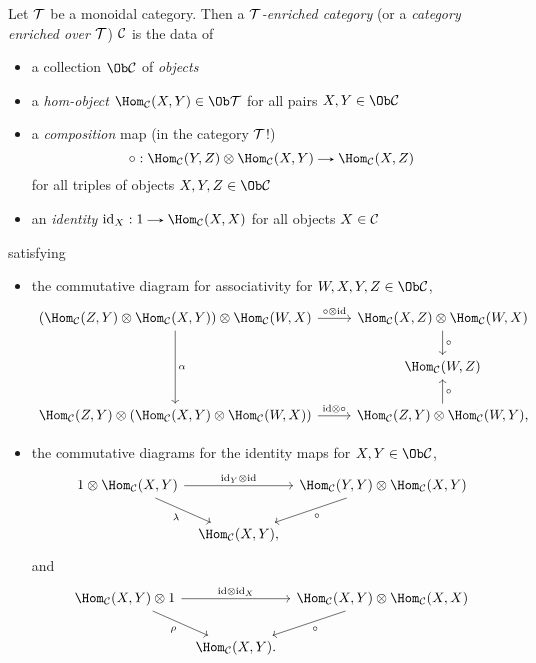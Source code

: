 \begin{definition}
  Let $\mathcal{T}$ be a monoidal category. Then a \textit{$\mathcal{T}$-enriched
    category} (or a \textit{category enriched over $\mathcal{T}$}) $\mathcal{C}$ is the
  data of
  \begin{itemize}
  \item a collection $\Ob\C$ of \textit{objects}
  \item a \textit{hom-object} $\Hom_\C(X,Y) \in \Ob\T$ for all pairs
    $X,Y \in \Ob\C$
  \item a \textit{composition} map (in the category $\mathcal{T}$!)
    \[
    \circ : \Hom_\C(Y,Z) \otimes \Hom_\C(X,Y) \to \Hom_\C(X,Z)
    \]
    for all triples of objects $X,Y,Z \in \Ob\C$
  \item an \textit{identity} $\id_X : 1 \to \Hom_\C(X,X)$ for all
    objects $X \in \mathcal{C}$
  \end{itemize}
  satisfying
  \begin{itemize}
  \item the commutative diagram for associativity for $W,X,Y,Z \in \Ob
    \C$,
    \[
    \begin{tikzcd}
      (\Hom_\C(Z,Y) \otimes \Hom_\C(X,Y)) \otimes \Hom_\C(W,X)
      \rar{\circ \otimes \id} \ar{dd}{\alpha} & \Hom_\C(X,Z) \otimes
      \Hom_\C(W,X) \dar{\circ} \\ \ & \Hom_\C(W,Z) \\ \Hom_\C(Z,Y)
      \otimes (\Hom_\C(X,Y) \otimes \Hom_\C(W,X)) \rar{\id \otimes
        \circ} & \Hom_\C(Z,Y) \otimes \Hom_\C(W,Y),
      \ar{u}[right]{\circ}
    \end{tikzcd}
    \]
  \item the commutative diagrams for the identity maps for $X,Y \in
    \Ob\C$,
    \[
    \begin{tikzcd}[column sep = tiny]
      1 \otimes \Hom_\C(X,Y) \ar{rr}{\id_Y \otimes \id}
      \ar{dr}[below]{\lambda\hspace{10pt}} & \ & \Hom_\C(Y,Y) \otimes
      \Hom_\C(X,Y) \ar{dl}{\circ} \\ \ & \Hom_\C(X,Y), & \
    \end{tikzcd}
    \]
    and
    \[
    \begin{tikzcd}[column sep = tiny]
      \Hom_\C(X,Y) \otimes 1 \ar{rr}{\id \otimes \id_X}
      \ar{dr}[below]{\rho\hspace{10pt}} & \ & \Hom_\C(X,Y) \otimes
      \Hom_\C(X,X) \ar{dl}{\circ} \\ \ & \Hom_\C(X,Y). & \
    \end{tikzcd}
    \]
  \end{itemize}
\end{definition}

